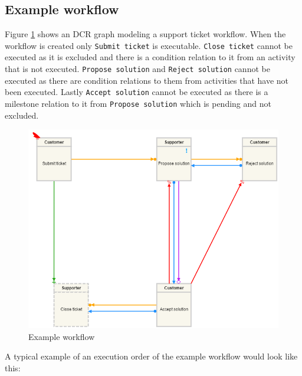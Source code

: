 \documentclass{article}
\begin{document}
	\subsection{Example workflow}
	Figure \ref{fig:exampleWorkflow} shows an DCR graph modeling a support ticket workflow. When the workflow is created only \texttt{Submit ticket} is executable. 
	\texttt{Close ticket} cannot be executed as it is excluded and there is a condition relation to it from an activity that is not executed. 
	\texttt{Propose solution} and \texttt{Reject solution} cannot be executed as there are condition relations to them from activities that have not been executed. 
	Lastly \texttt{Accept solution} cannot be executed as there is a milestone relation to it from \texttt{Propose solution} which is pending and not excluded.
	\begin{figure}[h!]
		\centering
		\includegraphics[width=\textwidth]{figures/exampleWorkflow.png}
	 	\caption[Example workflow]
	 	{Example workflow}
	 	\label{fig:exampleWorkflow}
	\end{figure}
	\FloatBarrier
	A typical example of an execution order of the example workflow would look like this:
\end{document}
